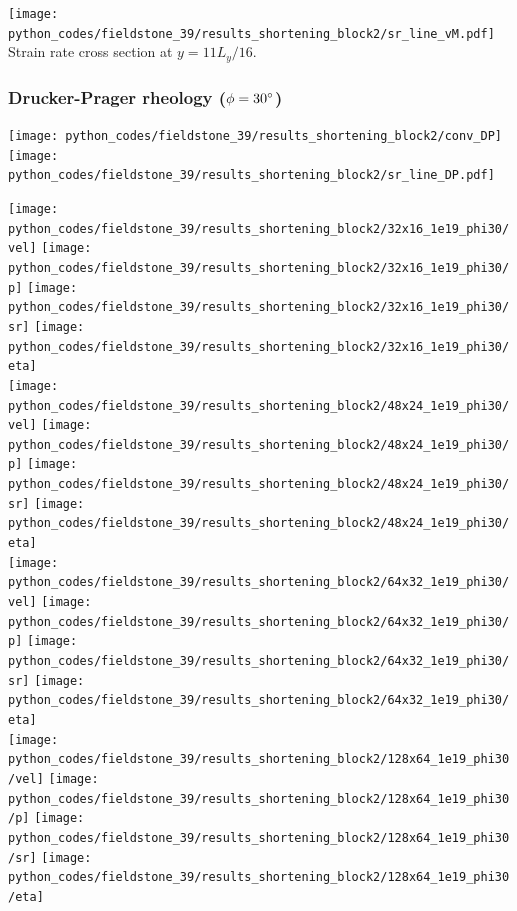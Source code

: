 \begin{center}
\texttt{[image: python\_codes/fieldstone\_39/results\_shortening\_block2/sr\_line\_vM.pdf]}\\
{\captionfont Strain rate cross section at $y=11L_y/16$.}
\end{center}


\clearpage
\subsubsection*{Drucker-Prager rheology ($\phi=30\degree$)}

\texttt{[image: python\_codes/fieldstone\_39/results\_shortening\_block2/conv\_DP]}
\texttt{[image: python\_codes/fieldstone\_39/results\_shortening\_block2/sr\_line\_DP.pdf]}

\begin{center}
\texttt{[image: python\_codes/fieldstone\_39/results\_shortening\_block2/32x16\_1e19\_phi30/vel]}
\texttt{[image: python\_codes/fieldstone\_39/results\_shortening\_block2/32x16\_1e19\_phi30/p]}
\texttt{[image: python\_codes/fieldstone\_39/results\_shortening\_block2/32x16\_1e19\_phi30/sr]}
\texttt{[image: python\_codes/fieldstone\_39/results\_shortening\_block2/32x16\_1e19\_phi30/eta]}\\
\texttt{[image: python\_codes/fieldstone\_39/results\_shortening\_block2/48x24\_1e19\_phi30/vel]}
\texttt{[image: python\_codes/fieldstone\_39/results\_shortening\_block2/48x24\_1e19\_phi30/p]}
\texttt{[image: python\_codes/fieldstone\_39/results\_shortening\_block2/48x24\_1e19\_phi30/sr]}
\texttt{[image: python\_codes/fieldstone\_39/results\_shortening\_block2/48x24\_1e19\_phi30/eta]}\\
\texttt{[image: python\_codes/fieldstone\_39/results\_shortening\_block2/64x32\_1e19\_phi30/vel]}
\texttt{[image: python\_codes/fieldstone\_39/results\_shortening\_block2/64x32\_1e19\_phi30/p]}
\texttt{[image: python\_codes/fieldstone\_39/results\_shortening\_block2/64x32\_1e19\_phi30/sr]}
\texttt{[image: python\_codes/fieldstone\_39/results\_shortening\_block2/64x32\_1e19\_phi30/eta]}\\
\texttt{[image: python\_codes/fieldstone\_39/results\_shortening\_block2/128x64\_1e19\_phi30/vel]}
\texttt{[image: python\_codes/fieldstone\_39/results\_shortening\_block2/128x64\_1e19\_phi30/p]}
\texttt{[image: python\_codes/fieldstone\_39/results\_shortening\_block2/128x64\_1e19\_phi30/sr]}
\texttt{[image: python\_codes/fieldstone\_39/results\_shortening\_block2/128x64\_1e19\_phi30/eta]}\\

\end{center}
